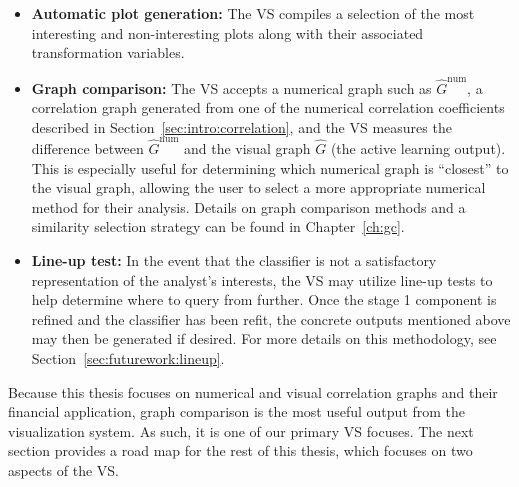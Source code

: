 \tablespacing
\begin{itemize}
	\item \textbf{Automatic plot generation:} The VS compiles a selection of 
	the most interesting and non-interesting plots along with their 
	associated transformation variables.
	
	\item \textbf{Graph comparison:} The VS accepts a numerical graph such as 
	$\hat{G}^{\text{num}}$, a correlation graph generated from one of the 
	numerical correlation coefficients described in 
	Section~\ref{sec:intro:correlation}, and the VS measures the difference 
	between $\hat{G}^{\text{num}}$ and the visual graph $\hat{G}$ (the active 
	learning output). This is especially useful 
	for determining which numerical graph is ``closest'' to the visual graph, 
	allowing the user to select a more appropriate numerical method for their 
	analysis. Details on graph comparison methods and a similarity 
	selection strategy can be found in Chapter~\ref{ch:gc}.
	
	\item \textbf{Line-up test:} In the event that the classifier is not a 
	satisfactory representation of the analyst's interests, the VS may utilize 
	line-up tests to help determine where to query from further. Once the stage 
	1 component is refined and the classifier has been refit, the concrete 
	outputs mentioned above may then be generated if desired. For more 
	details on this methodology, see Section~\ref{sec:futurework:lineup}.
\end{itemize}
\bodyspacing

Because this thesis focuses on numerical and visual correlation graphs and 
their financial application, graph comparison is 
the most useful output from the visualization system. As such, it is one of our 
primary VS focuses. The next section provides a road map for the rest of this 
thesis, which focuses on two aspects of the VS. 